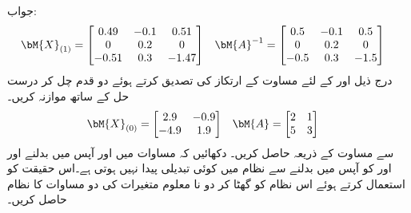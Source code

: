 جواب:
\begin{align*}
\bM{X}_{(1)}&=
\begin{bmatrix} 0.49&-0.1&0.51\\0&0.2&0\\-0.51&0.3&-1.47 \end{bmatrix} &
\bM{A}^{-1}&=\begin{bmatrix} 0.5&-0.1&0.5\\ 0&0.2&0\\ -0.5&0.3&-1.5 \end{bmatrix}
\end{align*}
\quad
درج ذیل  اور   کے لئے مساوت  کے ارتکاز کی تصدیق کرتے ہوئے  دو قدم چل کر درست حل کے ساتھ موازنہ کریں۔
\begin{align*}
\bM{X}_{(0)}&=\begin{bmatrix} 2.9& -0.9\\-4.9&1.9 \end{bmatrix} &
\bM{A}&=\begin{bmatrix} 2&1\\ 5&3 \end{bmatrix}
\end{align*}
\quad
{} سے مساوت  کے ذریعہ  حاصل کریں۔
\quad
دکھائیں کہ مساوات  میں  اور  آپس میں بدلنے اور  اور  کو آپس میں بدلنے سے نظام میں کوئی تبدیلی پیدا نہیں ہوتی ہے۔اس حقیقت کو استعمال کرتے ہوئے اس نظام کو گھٹا کر دو نا معلوم متغیرات کی دو مساوات کا نظام حاصل کریں۔


